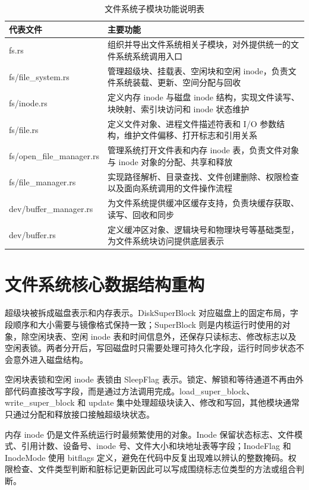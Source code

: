 \begin{table}[htbp]
  \centering
  \caption{文件系统子模块功能说明表}\label{tab:fs-modules}
  \begin{tabular}{p{}p{}}
    \toprule
    \textbf{代表文件} & \textbf{主要功能} \\
    \midrule
    fs.rs & 组织并导出文件系统相关子模块，对外提供统一的文件系统系统调用入口 \\
    fs/file\_system.rs & 管理超级块、挂载表、空闲块和空闲 inode，负责文件系统装载、更新、空间分配与回收 \\
    fs/inode.rs & 定义内存 inode 与磁盘 inode 结构，实现文件读写、块映射、索引块访问和 inode 状态维护 \\
    fs/file.rs & 定义文件对象、进程文件描述符表和 I/O 参数结构，维护文件偏移、打开标志和引用关系 \\
    fs/open\_file\_manager.rs & 管理系统打开文件表和内存 inode 表，负责文件对象与 inode 对象的分配、共享和释放 \\
    fs/file\_manager.rs & 实现路径解析、目录查找、文件创建删除、权限检查以及面向系统调用的文件操作流程 \\
    dev/buffer\_manager.rs & 为文件系统提供缓冲区缓存支持，负责块缓存获取、读写、回收和同步 \\
    dev/buffer.rs & 定义缓冲区对象、逻辑块号和物理块号等基础类型，为文件系统块访问提供底层表示 \\
    \bottomrule
  \end{tabular}
\end{table}

\section{文件系统核心数据结构重构}

超级块被拆成磁盘表示和内存表示。DiskSuperBlock 对应磁盘上的固定布局，字段顺序和大小需要与镜像格式保持一致；SuperBlock 则是内核运行时使用的对象，除空闲块表、空闲 inode 表和时间信息外，还保存只读标志、修改标志以及空闲表锁。两者分开后，写回磁盘时只需要处理可持久化字段，运行时同步状态不会意外进入磁盘结构。

空闲块表锁和空闲 inode 表锁由 SleepFlag 表示。锁定、解锁和等待通道不再由外部代码直接改写字段，而是通过方法调用完成。load\_super\_block、write\_super\_block 和 update 集中处理超级块读入、修改和写回，其他模块通常只通过分配和释放接口接触超级块状态。

内存 inode 仍是文件系统运行时最频繁使用的对象。Inode 保留状态标志、文件模式、引用计数、设备号、inode 号、文件大小和块地址表等字段；InodeFlag 和 InodeMode 使用 bitflags 定义，避免在代码中反复出现难以辨认的整数掩码。权限检查、文件类型判断和脏标记更新因此可以写成围绕标志位类型的方法或组合判断。

